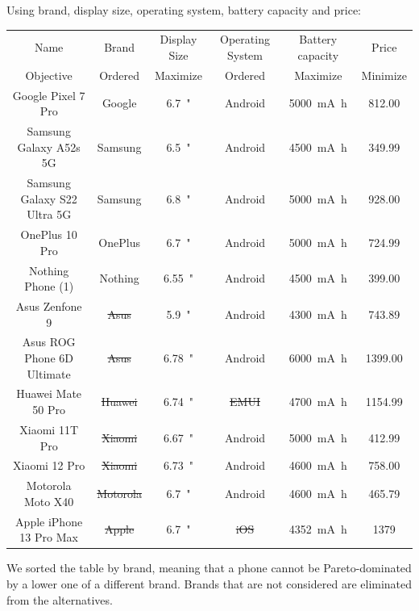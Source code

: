\documentclass[answers, 10pt, UKenglish]{exam}
\newcommand{\price}[1]{\SI[round-precision=2,round-mode=places,round-integer-to-decimal]{#1}[]{\SIeuro}}
\newcommand{\displaysize}[1]{\qty{#1}{"}}
\newcommand{\capacity}[1]{\qty{#1}{\milli\ampere\hour}}
\begin{document}
\begin{questions}
\begin{solutionorbox}
{		Using brand, display size, operating system, battery capacity and price:

		{
			\footnotesize
			\begin{tabular}{|c|c|c|c|c|c|}
							\hline
				Name & Brand & Display Size & Operating System & Battery capacity & Price \\%
				\hdashline
				Objective & Ordered & Maximize & Ordered & Maximize & Minimize \\
				\hline\hline
				Google Pixel 7 Pro & Google & \displaysize{6.7} & Android & \capacity{5000} & \price{812.00}\\%
				\hline
				Samsung Galaxy A52s 5G & Samsung & \displaysize{6.5} & Android & \capacity{4500} & \price{349.99}\\%
				\hline
				Samsung Galaxy S22 Ultra 5G & Samsung & \displaysize{6.8} & Android & \capacity{5000} & \price{928.00}\\%
				\hline
				OnePlus 10 Pro & OnePlus & \displaysize{6.7} & Android & \capacity{5000} & \price{724.99}\\%
				\hline
				Nothing Phone (1) & Nothing & \displaysize{6.55} & Android & \capacity{4500} & \price{399.00}\\%
				\hline
				Asus Zenfone 9 & \sout{Asus} & \displaysize{5.9} & Android & \capacity{4300} & \price{743.89}\\%
				\hline
				Asus ROG Phone 6D Ultimate & \sout{Asus} & \displaysize{6.78} & Android & \capacity{6000} & \price{1399.00}\\%
				\hline
				Huawei Mate 50 Pro & \sout{Huawei} & \displaysize{6.74} & \sout{EMUI} & \capacity{4700} & \price{1154.99}\\%
				\hline
				Xiaomi 11T Pro & \sout{Xiaomi} & \displaysize{6.67} & Android & \capacity{5000} & \price{412.99}\\%
				\hline
				Xiaomi 12 Pro & \sout{Xiaomi} & \displaysize{6.73} & Android & \capacity{4600} & \price{758.00}\\%
				\hline
				Motorola Moto X40 & \sout{Motorola} & \displaysize{6.7} & Android & \capacity{4600} & \price{465.79}\\%
				\hline
				Apple iPhone 13 Pro Max & \sout{Apple} & \displaysize{6.7} & \sout{iOS} & \capacity{4352} & \price{1379}\\%
				\hline
			\end{tabular}
		}

		We sorted the table by brand, meaning that a phone cannot be
		Pareto-dominated by a lower one of a different brand. Brands
		that are not considered are eliminated from the alternatives.

}
\end{solutionorbox}
\end{questions}
\end{document}
